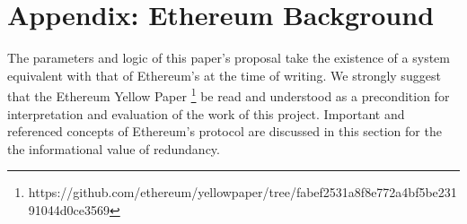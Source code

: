 \documentclass[11pt]{article}
\theoremstyle{plain}
\begin{document}







\pagebreak
\section{\normalsize{Appendix: Ethereum Background}}

The parameters and logic of this paper's proposal take the existence of a
system equivalent with that of Ethereum's at the time of writing.
We strongly suggest that the Ethereum Yellow Paper\nolinebreak
\footnote{https://github.com/ethereum/yellowpaper/tree/fabef2531a8f8e772a4bf5be23191044d0ce3569}
be read and understood as a precondition for interpretation and evaluation
of the work of this project.
Important and referenced concepts of Ethereum's protocol are discussed in this 
section for the the informational value of redundancy.
\end{document}
